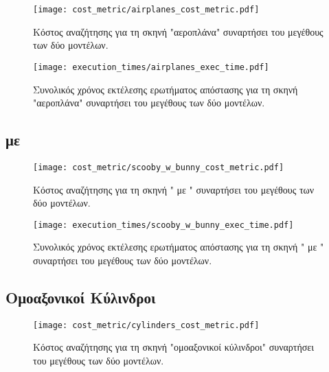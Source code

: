\begin{figure}[H]
    \centering
    \texttt{[image: cost\_metric/airplanes\_cost\_metric.pdf]}
    \caption[Κόστος Αναζήτησης για "αεροπλάνα"] {
        Κόστος αναζήτησης για τη σκηνή "αεροπλάνα" συναρτήσει 
        του μεγέθους των δύο μοντέλων.
    }
\end{figure}

\begin{figure}[H]
    \centering
    \texttt{[image: execution\_times/airplanes\_exec\_time.pdf]}
    \caption[Συνολικός Χρόνος Εκτέλεσης για "αεροπλάνα"] {
        Συνολικός χρόνος εκτέλεσης ερωτήματος απόστασης 
        για τη σκηνή "αεροπλάνα" συναρτήσει του μεγέθους των δύο μοντέλων.
    }
\end{figure}

\subsection{ με }
\begin{figure}[H]
    \centering
    \texttt{[image: cost\_metric/scooby\_w\_bunny\_cost\_metric.pdf]}
    \caption[Κόστος Αναζήτησης για " με "] {
        Κόστος αναζήτησης για τη σκηνή " με " συναρτήσει 
        του μεγέθους των δύο μοντέλων.
    }
\end{figure}

\begin{figure}[H]
    \centering
    \texttt{[image: execution\_times/scooby\_w\_bunny\_exec\_time.pdf]}
    \caption[Συνολικός Χρόνος Εκτέλεσης για " με "] {
        Συνολικός χρόνος εκτέλεσης ερωτήματος απόστασης 
        για τη σκηνή " με " συναρτήσει του μεγέθους των δύο μοντέλων.
    }
\end{figure}


\subsection{Ομοαξονικοί Κύλινδροι}
\begin{figure}[H]
    \centering
    \texttt{[image: cost\_metric/cylinders\_cost\_metric.pdf]}
    \caption[Κόστος Αναζήτησης για "ομοαξονικοί κύλινδροι"] {
        Κόστος αναζήτησης για τη σκηνή "ομοαξονικοί κύλινδροι" συναρτήσει 
        του μεγέθους των δύο μοντέλων.
    }
\end{figure}

